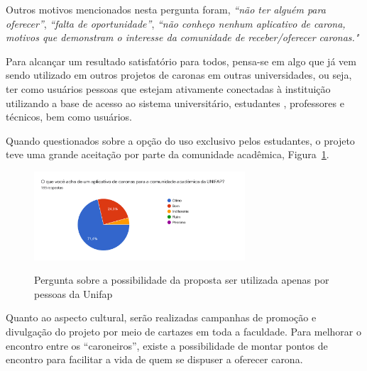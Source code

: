 

Outros motivos mencionados nesta pergunta foram, \textit{“não ter alguém para oferecer”}, \textit{“falta de oportunidade”}, \textit{“não conheço nenhum aplicativo de carona, motivos que demonstram o interesse da comunidade de receber/oferecer caronas."}

Para alcançar um resultado satisfatório para todos, pensa-se em algo que já vem sendo utilizado em outros projetos de caronas em outras universidades, ou seja, ter como usuários pessoas que estejam ativamente conectadas à instituição utilizando a base de acesso ao sistema universitário, estudantes , professores e técnicos, bem como usuários.

Quando questionados sobre a opção do uso exclusivo pelos estudantes, o projeto teve uma grande aceitação por parte da comunidade acadêmica, Figura~\ref{fig:aceitacao}. 

\begin{figure}[H]
	\centering
	\caption{Pergunta sobre a possibilidade da proposta ser utilizada apenas por pessoas da Unifap}
	\includegraphics[width=0.7\textwidth]{./04-figuras/questionario/5.png}
	\label{fig:aceitacao}
\end{figure}

Quanto ao aspecto cultural, serão realizadas campanhas de promoção e divulgação do projeto por meio de cartazes em toda a faculdade. Para melhorar o encontro entre os “caroneiros”, existe a possibilidade de montar pontos de encontro para facilitar a vida de quem se dispuser a oferecer carona.

